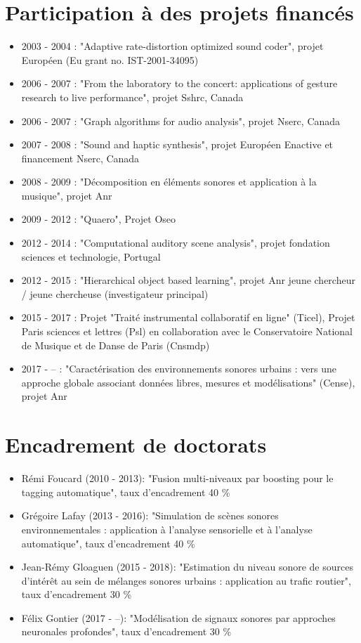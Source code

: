\section{Participation à des projets financés}
\begin{itemize}
\item 2003 - 2004 : "Adaptive rate-distortion optimized sound coder", projet Européen (Eu grant no. IST-2001-34095)
\item 2006 - 2007 : "From the laboratory to the concert: applications of gesture research to live performance", projet Sshrc, Canada
\item 2006 - 2007 : "Graph algorithms for audio analysis", projet Nserc, Canada
\item 2007 - 2008 : "Sound and haptic synthesis", projet Européen Enactive et financement Nserc, Canada
\item 2008 - 2009 : "Décomposition en éléments sonores et application à la musique", projet Anr
\item 2009 - 2012 : "Quaero", Projet Oseo
\item 2012 - 2014 : "Computational auditory scene analysis", projet fondation sciences et technologie, Portugal
\item 2012 - 2015 : "Hierarchical object based learning", projet Anr jeune chercheur / jeune chercheuse (investigateur principal)
\item 2015 - 2017 : Projet "Traité instrumental collaboratif en ligne" (Ticel), Projet Paris sciences et lettres (Psl) en collaboration avec le Conservatoire National de Musique et de Danse de Paris (Cnsmdp)
\item 2017 - -- : "Caractérisation des environnements sonores urbains : vers une approche globale associant données libres, mesures et modélisations" (Cense), projet Anr
\end{itemize}

\section{Encadrement de doctorats}
\begin{itemize}
  \item Rémi Foucard (2010 - 2013): "Fusion multi-niveaux par boosting pour le tagging automatique", taux d'encadrement 40 \%
  \item Grégoire Lafay (2013 - 2016): "Simulation de scènes sonores environnementales : application à l'analyse sensorielle et à l'analyse automatique", taux d'encadrement 40 \%
  \item Jean-Rémy Gloaguen (2015 - 2018): "Estimation du niveau sonore de sources d'intérêt au sein de mélanges sonores urbains : application au trafic routier", taux d'encadrement 30 \%
  \item Félix Gontier (2017 - --): "Modélisation de signaux sonores par approches neuronales profondes", taux d'encadrement 30 \%
\end{itemize}

